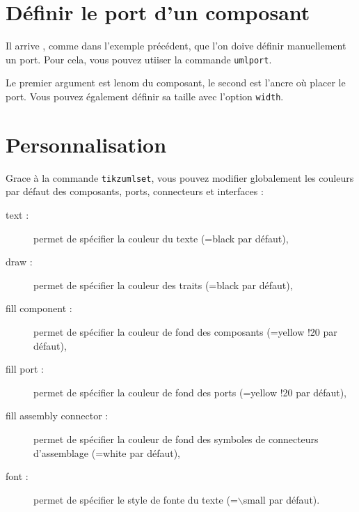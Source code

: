 \documentclass[a4paper,11pt]{report}
\newcommand{\inputTikZ}[1]{%
  }%
\newcommand{\inputTikZ}[1]{%
    \texttt{[image: fig/\#1.pdf]}%
  }%
\begin{document}
\medskip

\begin{minipage}{0.45\textwidth}

\end{minipage}
\begin{minipage}{0.55\textwidth}
\begin{center}
\inputTikZ{componentdelegateconnector}
\end{center}
\end{minipage}

\medskip

\section{Définir le port d'un composant}

Il arrive , comme dans l'exemple précédent, que l'on doive définir manuellement un port. Pour cela, vous pouvez utiiser la commande {\tt umlport}.

Le premier argument est lenom du composant, le second est l'ancre où placer le port. Vous pouvez également définir sa taille avec l'option {\tt width}.

\section{Personnalisation}

Grace à la commande {\tt tikzumlset}, vous pouvez modifier globalement les couleurs par défaut des composants, ports, connecteurs et interfaces :

\begin{description}
\item[text :] permet de spécifier la couleur du texte (=black par défaut),
\item[draw :] permet de spécifier la couleur des traits (=black par défaut),
\item[fill component :] permet de spécifier la couleur de fond des composants (=yellow !20 par défaut),
\item[fill port :] permet de spécifier la couleur de fond des ports (=yellow !20 par défaut),
\item[fill assembly connector :] permet de spécifier la couleur de fond des symboles de connecteurs d'assemblage (=white par défaut),
\item[font :] permet de spécifier le style de fonte du texte (=$\backslash$small par défaut).
\end{description}
\end{document}
